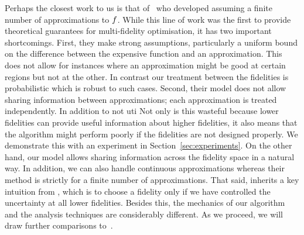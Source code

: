 Perhaps the closest work to us is that of~\citet{kandasamy16mfbo,kandasamy16mfbandit}
who developed \mfgpucbones assuming a finite number of approximations to $f$.
While this line of work was the first to provide theoretical guarantees for
multi-fidelity optimisation, it has two important shortcomings.
First, they make strong assumptions, particularly a uniform bound on the
difference between the expensive function and an approximation.
This does not allow for instances where an approximation might be good at certain regions
but not at the other.
In contrast our treatment between the fidelities is probabilistic which is robust
to such cases.
Second, their model does not allow sharing information between approximations; each
approximation is treated independently.
In addition to not uti
Not only is this wasteful because lower fidelities can provide useful information about
higher fidelities, it also means that the algorithm might perform poorly if the fidelities
are not designed properly.
We demonstrate this with an experiment in Section~\ref{sec:experiments}.
On the other hand, our model allows sharing information across the fidelity space in a
natural way.
In addition, we can also handle continuous approximations whereas their method is strictly
for a finite number of approximations.
That said, \mfgpucbtwos inherits a key intuition from \mfgpucbone,
which is to choose a fidelity only if we have controlled the uncertainty at all lower
fidelities.
Besides this, the mechanics
of our algorithm and the analysis techniques are considerably different.
As we proceed, we will draw further comparisons to~\citet{kandasamy16mfbo}.

